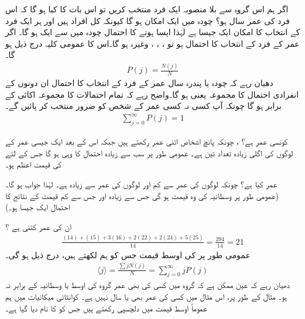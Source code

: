 \quad
اگر ہم اس گروہ سے بلا منصوبہ ایک فرد منتخب کریں تو اس بات کا کیا  ہو گا کہ اس فرد کی عمر  سال ہو؟
\quad
چودہ میں ایک امکان ہو گا کیونکہ کل  افراد ہیں اور ہر ایک فرد کے انتخاب کا امکان ایک جیسا ہے لہٰذا ایسا ہونے کا احتمال چودہ میں سے ایک ہو گا۔ اگر  عمر کے فرد کے انتخاب کا احتمال ہو تو ، ، ، وغیرہ ہو گا۔اس کا عمومی کلیہ درج ذیل ہو گا۔
\begin{align}
P(j) = \frac{N(j)}{N} 
\end{align}
دھیان رہے کہ چودہ یا پندرہ سال عمر کے فرد کے انتخاب کا احتمال ان دونوں کے انفرادی احتمال کا مجموعہ یعنی  ہو گا۔واضح رہے کہ تمام احتمالات کا مجموعہ اکائی  کے برابر ہو گا چونکہ آپ کسی نہ کسی عمر کے شخص کو ضرور منتخب کر پائیں گے۔ 
\begin{align}\label{مساوات_تفاعل_موج_کل_احتمال_اکائی}
\sum_{j=0}^{\infty} P(j) = 1
\end{align}

\quad
کونسی عمر  ہے؟
 \quad 
{}، چونکہ پانچ اشخاص اتنی عمر رکھتے ہیں جبکہ اس کے بعد ایک جیسی عمر کے لوگوں کی اگلی زیادہ تعداد تین ہے۔ عمومی طور پر سب سے زیادہ احتمال کا  وہی  ہو گا جس کے لئے کی قیمت اعظم ہو۔ 

  عمر کیا ہے؟ \quad
چونکہ  لوگوں کی عمر  سے کم اور  لوگوں کی عمر  سے زیادہ ہے۔ لہٰذا جواب  ہو گا۔ (عمومی طور پر وسطانیہ  کی وہ قیمت ہو گی جس سے زیادہ اور جس سے کم قیمت کے نتائج کا احتمال ایک جیسا ہو۔)

\quad
ان کی  عمر کتنی ہے ؟ 
\begin{align*}
 \frac{(14)+(15)+3(16)+2(22)+2(24)+5(25)}{14} = \frac{294}{14}=21 
\end{align*}
عمومی طور پر  کی اوسط قیمت جس کو ہم  لکھتے ہیں، درج ذیل ہو گی۔ 
\begin{align}\label{مساوات_تفاعل_موج_اوسط}
\langle j \rangle = \frac{\sum j N(j)}{N} = \sum_{j=0}^{\infty} jP(j) 
\end{align}
دھیان رہے کہ عین ممکن ہے کہ گروہ میں کسی کی بھی عمر گروہ کی اوسط یا وسطانیہ کے برابر نہ ہو۔ مثال کے طور پر، اس مثال میں کسی کی عمر بھی  یا  سال نہیں ہے۔ کوانٹائی میکانیات میں ہم عموماً اوسط قیمت میں دلچسپی رکھتے ہیں جس کو  کا نام دیا گیا ہے۔ 

